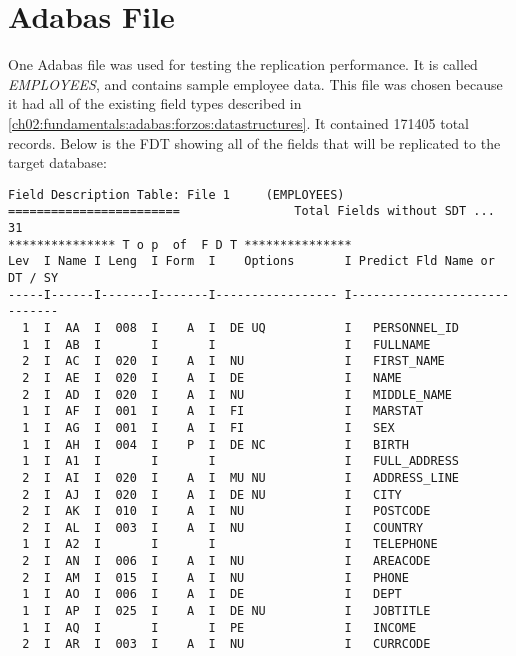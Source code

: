\section{Adabas File}
\label{ch05:methodology:adabasfile}
One Adabas file was used for testing the replication performance. It is called \textit{EMPLOYEES}, and contains sample employee data. This file was chosen because it had all of the existing field types described in \ref{ch02:fundamentals:adabas:forzos:datastructures}. It contained 171405 total records. Below is the \ac{FDT} showing all of the fields that will be replicated to the target database:
\begin{verbatim}
Field Description Table: File 1     (EMPLOYEES)                              
========================                Total Fields without SDT ... 31      
*************** T o p  of  F D T ***************                             
Lev  I Name I Leng  I Form  I    Options       I Predict Fld Name or DT / SY 
-----I------I-------I-------I----------------- I-----------------------------
  1  I  AA  I  008  I    A  I  DE UQ           I   PERSONNEL_ID              
  1  I  AB  I       I       I                  I   FULLNAME                  
  2  I  AC  I  020  I    A  I  NU              I   FIRST_NAME                
  2  I  AE  I  020  I    A  I  DE              I   NAME                      
  2  I  AD  I  020  I    A  I  NU              I   MIDDLE_NAME               
  1  I  AF  I  001  I    A  I  FI              I   MARSTAT                   
  1  I  AG  I  001  I    A  I  FI              I   SEX                       
  1  I  AH  I  004  I    P  I  DE NC           I   BIRTH                     
  1  I  A1  I       I       I                  I   FULL_ADDRESS              
  2  I  AI  I  020  I    A  I  MU NU           I   ADDRESS_LINE              
  2  I  AJ  I  020  I    A  I  DE NU           I   CITY                      
  2  I  AK  I  010  I    A  I  NU              I   POSTCODE                  
  2  I  AL  I  003  I    A  I  NU              I   COUNTRY                   
  1  I  A2  I       I       I                  I   TELEPHONE                 
  2  I  AN  I  006  I    A  I  NU              I   AREACODE                  
  2  I  AM  I  015  I    A  I  NU              I   PHONE                     
  1  I  AO  I  006  I    A  I  DE              I   DEPT                      
  1  I  AP  I  025  I    A  I  DE NU           I   JOBTITLE                  
  1  I  AQ  I       I       I  PE              I   INCOME                    
  2  I  AR  I  003  I    A  I  NU              I   CURRCODE                  

\end{verbatim}
